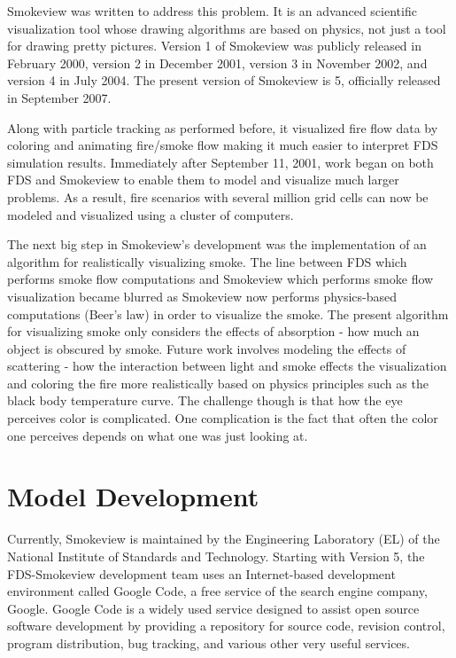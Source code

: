 \documentclass[11pt,twoside]{book}
\begin{document}
Smokeview was written to address this problem. It is an advanced
scientific visualization tool whose drawing algorithms are based
on physics, not just a tool for drawing pretty pictures. Version 1
of Smokeview was publicly released in February 2000, version 2 in
December 2001, version 3 in November 2002, and version 4 in July
2004. The present version of Smokeview is 5, officially released
in September 2007.

Along with particle tracking as performed before, it visualized
fire flow data by coloring and animating fire/smoke flow making it
much easier to interpret FDS simulation results.  Immediately
after September 11, 2001, work began on both FDS and Smokeview to
enable them to model and visualize much larger problems.  As a
result, fire scenarios with several million grid cells can now be
modeled and visualized using a cluster of computers.

The next big step in Smokeview's development was the
implementation of an algorithm for realistically visualizing
smoke. The line between FDS which performs smoke flow computations
and Smokeview which performs smoke flow visualization became
blurred as Smokeview now performs physics-based computations
(Beer's law) in order to visualize the smoke.  The present
algorithm for visualizing smoke only considers the effects of
absorption - how much an object is obscured by smoke.  Future work
involves modeling the effects of scattering - how the interaction
between light and smoke effects the visualization and coloring the
fire more realistically based on physics principles such as the
black body temperature curve.  The challenge though is that how
the eye perceives color is complicated.  One complication is the
fact that often the color one perceives depends on what one was
just looking at.

%
%

\section{Model Development}
Currently, Smokeview is maintained by the Engineering Laboratory
(EL) of the National Institute of Standards and Technology.
Starting with Version 5, the FDS-Smokeview development team uses
an Internet-based development environment called Google Code, a
free service of the search engine company, Google. Google Code is a
widely used service designed to assist open source software
development by providing a repository for source code, revision
control, program distribution, bug tracking, and various other
very useful services.
\end{document}
